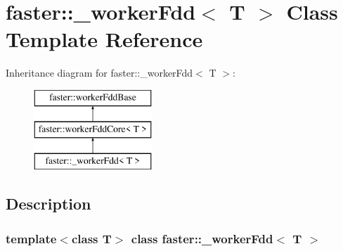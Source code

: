 \hypertarget{classfaster_1_1__workerFdd}{}\section{faster\+:\+:\+\_\+worker\+Fdd$<$ T $>$ Class Template Reference}
\label{classfaster_1_1__workerFdd}
Inheritance diagram for faster\+:\+:\+\_\+worker\+Fdd$<$ T $>$\+:\begin{figure}[H]
\begin{center}
\leavevmode
\includegraphics[height=3.000000cm]{classfaster_1_1__workerFdd}
\end{center}
\end{figure}


\subsection{Description}
\subsubsection*{template$<$class T$>$\newline
class faster\+::\+\_\+worker\+Fdd$<$ T $>$}

